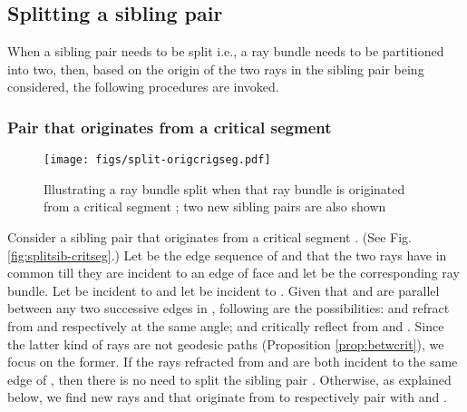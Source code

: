 \documentclass[11pt]{article}
\begin{document}
\subsection{Splitting a sibling pair}
\label{subsect:splitsibpair}

When a sibling pair needs to be split i.e.,  a ray bundle needs to be partitioned into two, then, based on the origin of the two rays in the sibling pair being considered, the following procedures are invoked.

\subsubsection{Pair that originates from a critical segment}
\label{subsubsect:splitcritseg}

\begin{figure}[h]
\begin{minipage}[t]{\linewidth}
\begin{center}
\texttt{[image: figs/split-origcrigseg.pdf]}
\caption{\footnotesize Illustrating a ray bundle split when that ray bundle is originated from a critical segment ; two new sibling pairs are also shown}
\label{fig:split-origcrigseg}
\end{center}
\end{minipage}
\vspace*{-0.2in}
\end{figure}

Consider a sibling pair  that originates from a critical segment . 
(See Fig. \ref{fig:splitsib-critseg}.)
Let  be the edge sequence of  and  that the two rays have in common till they are incident to an edge  of face  and let  be the corresponding ray bundle.
Let  be incident to  and let  be incident to .
Given that  and  are parallel between any two successive edges in , following are the possibilities:
 and  refract from  and  respectively at the same angle;
 and  critically reflect from  and .
Since the latter kind of rays are not geodesic paths (Proposition \ref{prop:betwcrit}), we focus on the former.
If the rays refracted from  and  are both incident to the same edge of , then there is no need to split the sibling pair .
Otherwise, as explained below, we find new rays  and  that originate from  to respectively pair with  and .
\end{document}
